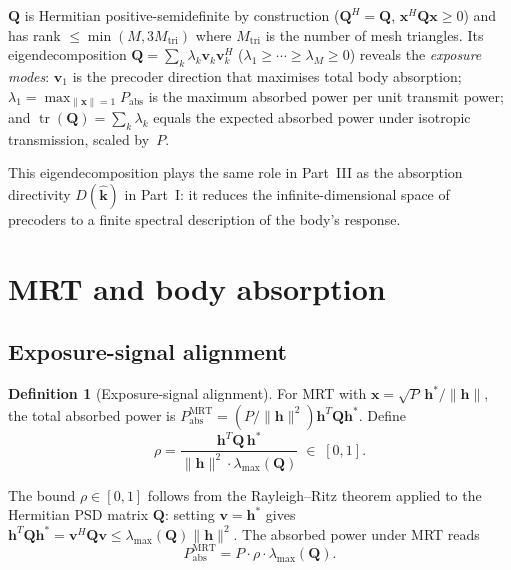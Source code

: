 \documentclass[11pt,a4paper]{article}
\theoremstyle{definition}      %
\newtheorem{definition}[definition]{Definition}
\newcommand{\khat}{\hat{\bm{k}}}
\begin{document}
$\mathbf{Q}$ is Hermitian positive-semidefinite by construction
($\mathbf{Q}^H = \mathbf{Q}$, $\mathbf{x}^H\mathbf{Q}\mathbf{x} \geq 0$)
and has rank $\leq \min(M, 3M_\mathrm{tri})$ where $M_\mathrm{tri}$
is the number of mesh triangles.  Its eigendecomposition
$\mathbf{Q} = \sum_k \lambda_k \mathbf{v}_k\mathbf{v}_k^H$
($\lambda_1 \geq \cdots \geq \lambda_M \geq 0$) reveals the
\emph{exposure modes}: $\mathbf{v}_1$ is the precoder direction that
maximises total body absorption;
$\lambda_1 = \max_{\|\mathbf{x}\|=1} P_\mathrm{abs}$ is the
maximum absorbed power per unit transmit power; and
$\operatorname{tr}(\mathbf{Q}) = \sum_k \lambda_k$ equals the
expected absorbed power under isotropic transmission, scaled by~$P$.

This eigendecomposition plays the same role in Part~III as the
absorption directivity $D(\khat)$ in Part~I: it reduces the
infinite-dimensional space of precoders to a finite spectral
description of the body's response.

\section{MRT and body absorption}\label{sec:MRT-body-section}

\subsection{Exposure-signal alignment}\label{sec:rho}

\begin{definition}[Exposure-signal alignment]\label{def:rho}
For MRT with $\mathbf{x} = \sqrt{P}\,\mathbf{h}^*/\|\mathbf{h}\|$,
the total absorbed power is
$P_\mathrm{abs}^\mathrm{MRT} = (P/\|\mathbf{h}\|^2)
\mathbf{h}^T\mathbf{Q}\mathbf{h}^*$.
Define
\begin{equation}\label{eq:rho-def}
  \boxed{\rho = \frac{\mathbf{h}^T\mathbf{Q}\,\mathbf{h}^*}
  {\|\mathbf{h}\|^2 \cdot \lambda_\mathrm{max}(\mathbf{Q})}
  \;\in\; [0,1].}
\end{equation}
\end{definition}

The bound $\rho \in [0,1]$ follows from the Rayleigh--Ritz theorem
applied to the Hermitian PSD matrix $\mathbf{Q}$: setting
$\mathbf{v} = \mathbf{h}^*$ gives $\mathbf{h}^T\mathbf{Q}\mathbf{h}^*
= \mathbf{v}^H\mathbf{Q}\mathbf{v} \leq \lambda_\mathrm{max}(\mathbf{Q})
\|\mathbf{h}\|^2$.  The absorbed power under MRT reads
\begin{equation}\label{eq:Pabs-MRT}
  P_\mathrm{abs}^\mathrm{MRT} = P\cdot\rho\cdot\lambda_\mathrm{max}(\mathbf{Q}).
\end{equation}
\end{document}
